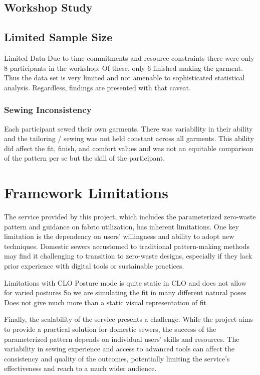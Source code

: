 \subsection{Workshop Study}
\subsection{Limited Sample Size}
Limited Data
Due to time commitments and resource constraints there were only 8 participants in the workshop. Of these, only 6 finished making the garment. Thus the data set is very limited and not amenable to sophisticated statistical analysis. Regardless, findings are presented with that caveat.
\subsubsection{Sewing Inconsistency}

Each participant sewed their own garments. There was variability in their ability and the tailoring / sewing was not held constant across all garments. This ability did affect the fit, finish, and comfort values and was not an equitable comparison of the pattern per se but the skill of the participant.

\section{Framework Limitations}

The service provided by this project, which includes the parameterized zero-waste pattern and guidance on fabric utilization, has inherent limitations. One key limitation is the dependency on users’ willingness and ability to adopt new techniques. Domestic sewers accustomed to traditional pattern-making methods may find it challenging to transition to zero-waste designs, especially if they lack prior experience with digital tools or sustainable practices.

Limitations with CLO
Posture mode is quite static in CLO and does not allow for varied postures
So we are simulating the fit in many different natural poses
Does not give much more than a static visual representation of fit

Finally, the scalability of the service presents a challenge. While the project aims to provide a practical solution for domestic sewers, the success of the parameterized pattern depends on individual users’ skills and resources. The variability in sewing experience and access to advanced tools can affect the consistency and quality of the outcomes, potentially limiting the service’s effectiveness and reach to a much wider audience.

